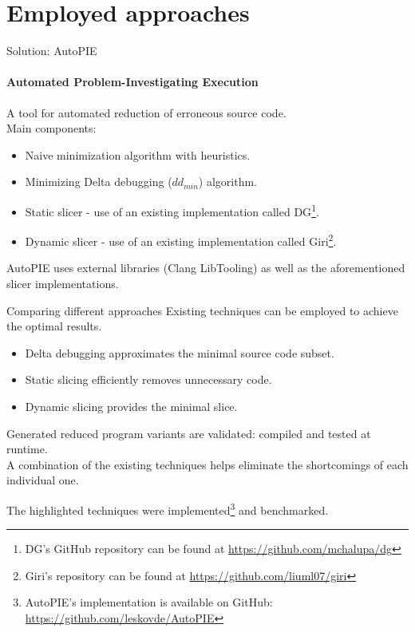 \documentclass{beamer}
\begin{document}
\section{Employed approaches}

    \begin{frame}{Solution: AutoPIE}
      \framesubtitle{Automated Problem-Investigating Execution}
      A tool for automated reduction of erroneous source code.\\
      \bigskip
      Main components:
      \begin{itemize}
          \item Naive minimization algorithm with heuristics.\\
          \item Minimizing Delta debugging ($dd_{min}$) algorithm.\\
          \item Static slicer - use of an existing implementation called DG\footnote[frame]{%
          DG's GitHub repository can be found at \url{https://github.com/mchalupa/dg}}.\\
          \item Dynamic slicer - use of an existing implementation called Giri\footnote[frame]{%
          Giri's repository can be found at \url{https://github.com/liuml07/giri}}.\\
      \end{itemize}
      
      \bigskip

      AutoPIE uses external libraries (Clang LibTooling) as well as the aforementioned slicer implementations.\\
      
    \end{frame}

    \begin{frame}{Comparing different approaches}
      Existing techniques can be employed to achieve the optimal results.\\
      \begin{itemize}
          \item \alert{Delta debugging} approximates the minimal source code subset.\\
          \item \alert{Static slicing} efficiently removes unnecessary code.\\
          \item \alert{Dynamic slicing} provides the minimal slice.\\
      \end{itemize}
    
      \bigskip
      Generated reduced program variants are \alert{validated}: compiled and tested at runtime.\\
      \bigskip
      A combination of the existing techniques helps eliminate the shortcomings of each individual one.\\
      \bigskip
      
      The highlighted techniques were implemented\footnote[frame]{%
          AutoPIE's implementation is available on GitHub: \url{https://github.com/leskovde/AutoPIE}} and benchmarked.
    \end{frame}
\end{document}
